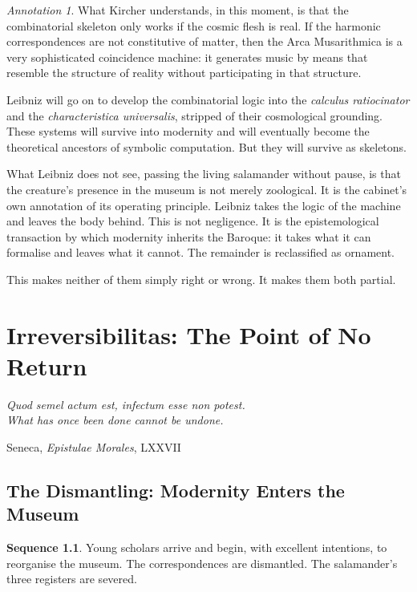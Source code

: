\documentclass[12pt, a4paper, twoside]{memoir}
\theoremstyle{definition}
\newtheorem{sequence}{Sequence}[chapter]
\theoremstyle{remark}
\newtheorem{annotation}{Annotation}[chapter]
\begin{document}
\begin{annotation}
What Kircher understands, in this moment, is that the combinatorial skeleton only works if the cosmic flesh is real. If the harmonic correspondences are not constitutive of matter, then the Arca Musarithmica is a very sophisticated coincidence machine: it generates music by means that resemble the structure of reality without participating in that structure.

Leibniz will go on to develop the combinatorial logic into the \textit{calculus ratiocinator} and the \textit{characteristica universalis}, stripped of their cosmological grounding. These systems will survive into modernity and will eventually become the theoretical ancestors of symbolic computation. But they will survive as skeletons.

What Leibniz does not see, passing the living salamander without pause, is that the creature's presence in the museum is not merely zoological. It is the cabinet's own annotation of its operating principle. Leibniz takes the logic of the machine and leaves the body behind. This is not negligence. It is the epistemological transaction by which modernity inherits the Baroque: it takes what it can formalise and leaves what it cannot. The remainder is reclassified as ornament.

This makes neither of them simply right or wrong. It makes them both partial.
\end{annotation}

\clearpage

\chapter{Irreversibilitas: The Point of No Return}

\epigraph{\itshape Quod semel actum est, infectum esse non potest.\\
What has once been done cannot be undone.}{Seneca, \textit{Epistulae Morales}, LXXVII}

\section{The Dismantling: Modernity Enters the Museum}

\begin{sequence}
\label{seq:dismantling}
Young scholars arrive and begin, with excellent intentions, to reorganise the museum. The correspondences are dismantled. The salamander's three registers are severed.
\end{sequence}
\end{document}
